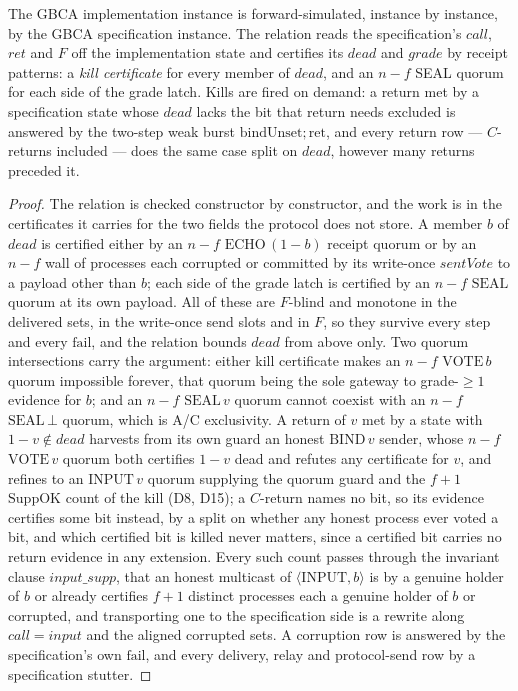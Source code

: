 \begin{theorem}
  \label{thm:gbca-inst-refines}
  \leanok
  The GBCA implementation instance is forward-simulated, instance by instance, by the GBCA specification instance.
  The relation reads the specification's $call$, $ret$ and $F$ off the implementation state and certifies its $dead$ and $grade$ by receipt patterns: a \emph{kill certificate} for every member of $dead$, and an $n{-}f$ SEAL quorum for each side of the grade latch.
  Kills are fired on demand: a return met by a specification state whose $dead$ lacks the bit that return needs excluded is answered by the two-step weak burst $\mathrm{bindUnset};\mathrm{ret}$, and every return row --- $C$-returns included --- does the same case split on $dead$, however many returns preceded it.
\end{theorem}

\begin{proof}\leanok
  The relation is checked constructor by constructor, and the work is in the certificates it carries for the two fields the protocol does not store.
  A member $b$ of $dead$ is certified either by an $n{-}f$ $\mathrm{ECHO}\,(1-b)$ receipt quorum or by an $n{-}f$ wall of processes each corrupted or committed by its write-once $\mathit{sentVote}$ to a payload other than $b$; each side of the grade latch is certified by an $n{-}f$ $\mathrm{SEAL}$ quorum at its own payload.
  All of these are $F$-blind and monotone in the delivered sets, in the write-once send slots and in $F$, so they survive every step and every $\mathrm{fail}$, and the relation bounds $dead$ from above only.
  Two quorum intersections carry the argument: either kill certificate makes an $n{-}f$ $\mathrm{VOTE}\,b$ quorum impossible forever, that quorum being the sole gateway to grade-$\ge 1$ evidence for $b$; and an $n{-}f$ $\mathrm{SEAL}\,v$ quorum cannot coexist with an $n{-}f$ $\mathrm{SEAL}\,\bot$ quorum, which is A/C exclusivity.
  A return of $v$ met by a state with $1-v \notin dead$ harvests from its own guard an honest $\mathrm{BIND}\,v$ sender, whose $n{-}f$ $\mathrm{VOTE}\,v$ quorum both certifies $1-v$ dead and refutes any certificate for $v$, and refines to an $\mathrm{INPUT}\,v$ quorum supplying the quorum guard and the $f{+}1$ $\mathrm{SuppOK}$ count of the kill (D8, D15); a $C$-return names no bit, so its evidence certifies some bit instead, by a split on whether any honest process ever voted a bit, and which certified bit is killed never matters, since a certified bit carries no return evidence in any extension.
  Every such count passes through the invariant clause $input\_supp$, that an honest multicast of $\langle\mathrm{INPUT},b\rangle$ is by a genuine holder of $b$ or already certifies $f{+}1$ distinct processes each a genuine holder of $b$ or corrupted, and transporting one to the specification side is a rewrite along $call = \mathit{input}$ and the aligned corrupted sets.
  A corruption row is answered by the specification's own $\mathrm{fail}$, and every delivery, relay and protocol-send row by a specification stutter.
\end{proof}
